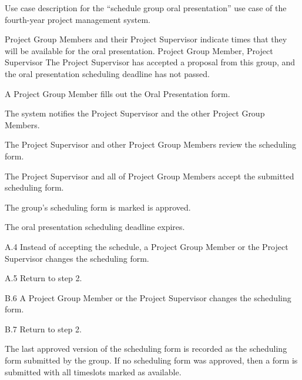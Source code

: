 \begin{table}
  \centering
  \caption{Use case description for the ``schedule group oral presentation'' use case of the fourth-year project management system.}
  \label{tbl:use-case-schedule-group-oral}

  \begin{usecase}
    Project Group Members and their Project Supervisor indicate times that they will be available for the oral presentation.
    Project Group Member, Project Supervisor
    The Project Supervisor has accepted a proposal from this group, and the oral presentation scheduling deadline has not passed.
    \ucnormal
    \begin{ucenum}
      \item A Project Group Member fills out the Oral Presentation form.
      \item The system notifies the Project Supervisor and the other Project Group Members.
      \item The Project Supervisor and other Project Group Members review the scheduling form.
      \item The Project Supervisor and all of Project Group Members accept the submitted scheduling form.
      \item The group’s scheduling form is marked is approved.
      \item The oral presentation scheduling deadline expires.
    \end{ucenum}
    \begin{ucenum*}
      \item [A.4] Instead of accepting the schedule, a Project Group Member or the Project Supervisor changes the scheduling form.
      \item [A.5] Return to step 2.
    \end{ucenum*}
    \begin{ucenum}
      \item [B.6] A Project Group Member or the Project Supervisor changes the scheduling form.
      \item [B.7] Return to step 2.
    \end{ucenum}
    The last approved version of the scheduling form is recorded as the scheduling form submitted by the group. If no scheduling form was approved, then a form is submitted with all timeslots marked as available.
  \end{usecase}
\end{table}


